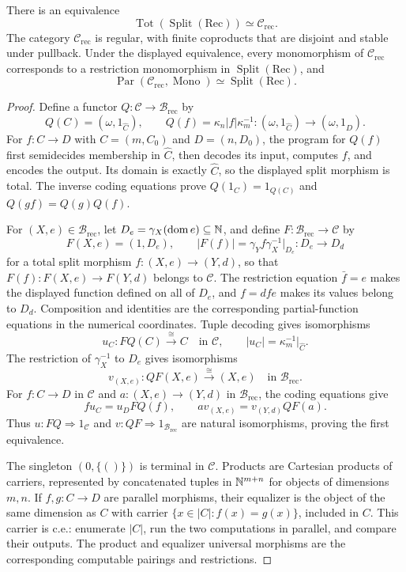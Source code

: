 \begin{proposition}\label{prop:numerical-structure}
There is an equivalence
\[
 \operatorname{Tot}(\operatorname{Split}(\mathrm{Rec}))
       \simeq\mathcal C_{\mathrm{rec}}.
\]
The category $\mathcal C_{\mathrm{rec}}$ is regular, with finite
coproducts that are disjoint and stable under pullback. Under the
displayed equivalence, every monomorphism of $\mathcal C_{\mathrm{rec}}$
corresponds to a restriction monomorphism in
$\operatorname{Split}(\mathrm{Rec})$, and
\[
 \operatorname{Par}(\mathcal C_{\mathrm{rec}},\operatorname{Mono})
       \simeq\operatorname{Split}(\mathrm{Rec}).
\]
\end{proposition}
\begin{proof}
Define a functor $Q:\mathcal C\to\mathcal B_{\mathrm{rec}}$ by
\[
 Q(C)=(\omega,1_{\widehat C}),\qquad
 Q(f)=\kappa_n |f|\kappa_m^{-1}:
     (\omega,1_{\widehat C})\longrightarrow
     (\omega,1_{\widehat D}).
\]
For $f:C\to D$ with $C=(m,C_0)$ and $D=(n,D_0)$,
the program for $Q(f)$ first semidecides membership
in $\widehat C$, then decodes its input, computes $f$, and encodes
the output. Its domain is exactly $\widehat C$, so the displayed
split morphism is total. The inverse coding equations prove
$Q(1_C)=1_{Q(C)}$ and $Q(gf)=Q(g)Q(f)$.

For $(X,e)\in\mathcal B_{\mathrm{rec}}$, let
$D_e=\gamma_X(\operatorname{dom}e)\subseteq\mathbb N$, and define
$F:\mathcal B_{\mathrm{rec}}\to\mathcal C$ by
\[
 F(X,e)=(1,D_e),\qquad
 |F(f)|=\gamma_Y f\gamma_X^{-1}|_{D_e}:D_e\longrightarrow D_d
\]
for a total split morphism $f:(X,e)\to(Y,d)$, so that
$F(f):F(X,e)\to F(Y,d)$ belongs to $\mathcal C$.
The restriction equation $\bar f=e$ makes the displayed function defined
on all of $D_e$, and $f=dfe$ makes its values belong to $D_d$. Composition and identities
are the corresponding partial-function equations in the numerical
coordinates.
Tuple decoding gives isomorphisms
\[
 u_C:FQ(C)\xrightarrow{\cong}C
       \quad\text{in }\mathcal C,\qquad
       |u_C|=\kappa_m^{-1}|_{\widehat C}.
\]
The restriction of $\gamma_X^{-1}$ to $D_e$ gives isomorphisms
\[
 v_{(X,e)}:QF(X,e)\xrightarrow{\cong}(X,e)
       \quad\text{in }\mathcal B_{\mathrm{rec}}.
\]
For $f:C\to D$ in $\mathcal C$ and
$a:(X,e)\to(Y,d)$ in $\mathcal B_{\mathrm{rec}}$,
the coding equations give
\[
 f u_C=u_DFQ(f),\qquad
 a v_{(X,e)}=v_{(Y,d)}QF(a).
\]
Thus $u:FQ\Rightarrow1_{\mathcal C}$ and
$v:QF\Rightarrow1_{\mathcal B_{\mathrm{rec}}}$ are natural
isomorphisms, proving the first equivalence.

The singleton $(0,\{()\})$ is terminal in $\mathcal C$.
Products are Cartesian products of carriers, represented by
concatenated tuples in $\mathbb N^{m+n}$ for objects of dimensions $m,n$. If $f,g:C\to D$ are parallel morphisms, their
equalizer is the object of the same dimension as $C$ with carrier
$\{x\in|C|:f(x)=g(x)\}$, included in $C$. This carrier is c.e.:
enumerate $|C|$, run the two computations in parallel, and compare
their outputs. The product and equalizer universal morphisms are the
corresponding computable pairings and restrictions.


\end{proof}
